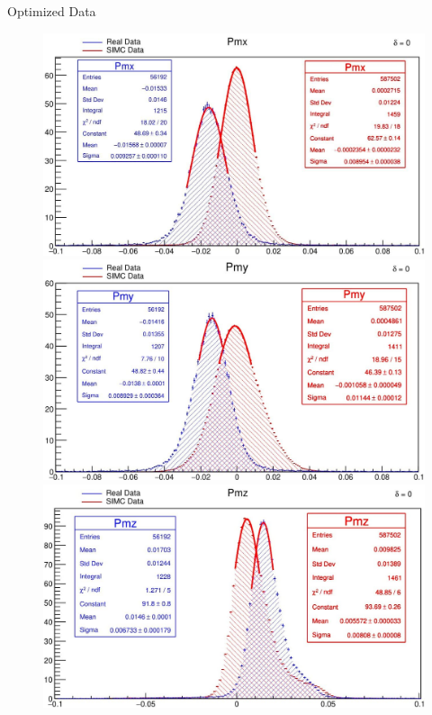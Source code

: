 \documentclass[final]{beamer}
\newlength{\colwidth}
\begin{document}
\begin{frame}[t]
\begin{columns}[t]
\begin{column}{\colwidth}
\begin{block}{Optimized Data}
\begin{figure}
 \begin{minipage}[t]{0.3\textwidth}
    \includegraphics[width=\linewidth]{calibrated data/model 3/Pmx_0.jpg}
  \end{minipage}
  \begin{minipage}[t]{0.3\textwidth}
    \includegraphics[width=\linewidth]{calibrated data/model 3/Pmy_0.jpg}
  \end{minipage}
  \begin{minipage}[t]{0.3\textwidth}
    \includegraphics[width=\linewidth]{calibrated data/model 3/Pmz_0.jpg}

\end{minipage}
\end{figure}
\end{block}
\end{column}
\end{columns}
\end{frame}
\end{document}
